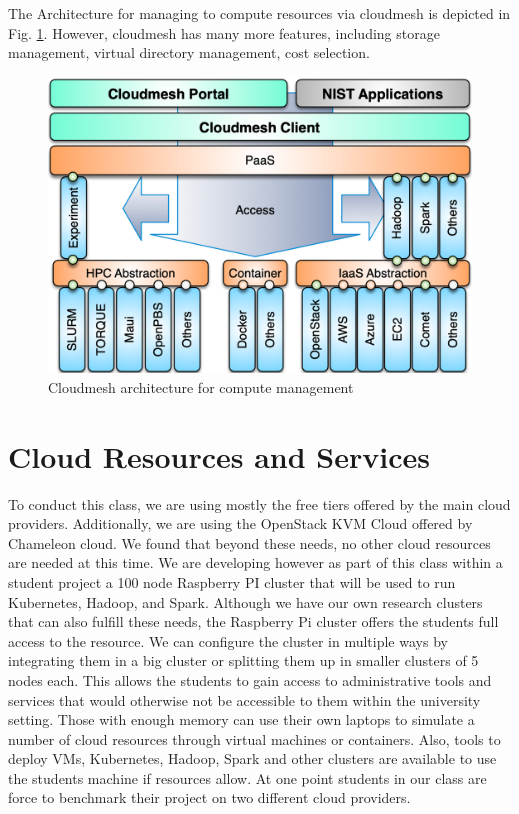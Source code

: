 \documentclass[conference]{IEEEtran}
\begin{document}
The Architecture for managing to compute resources via cloudmesh is
depicted in Fig. \ref{fig:cloudmesh-arch}. However, cloudmesh has many
more features, including storage management, virtual directory
management, cost selection.




\begin{figure}[htb]
  \caption{Cloudmesh architecture for compute management}\label{fig:cloudmesh-arch}
  \centering
    \includegraphics[width=0.9\columnwidth]{images/cloudmesh-arch.png}

\end{figure}


\section{Cloud Resources and Services}

To conduct this class, we are using mostly the free tiers offered by
the main cloud providers. Additionally, we are using the OpenStack KVM 
Cloud offered by Chameleon cloud. We found that beyond these needs, no
other cloud resources are needed at this time. We are developing
however as part of this class within a student project a 100 node
Raspberry PI cluster that will be used to run Kubernetes, Hadoop, and Spark.
Although we have our own research clusters that can also fulfill these
needs, the Raspberry Pi cluster offers the students full access to the
resource. We can configure the cluster in multiple ways by integrating
them in a big cluster or splitting them up in smaller clusters of 5
nodes each. This allows the students to gain access to administrative
tools and services that would otherwise not be accessible to them
within the university setting. Those with enough memory can use their
own laptops to simulate a number of cloud resources through virtual
machines or containers. Also, tools to deploy VMs,  Kubernetes, Hadoop, Spark
and other clusters are available to use the students machine if
resources allow. At one point students in our class are force to
benchmark their project on two different cloud providers.
\end{document}
